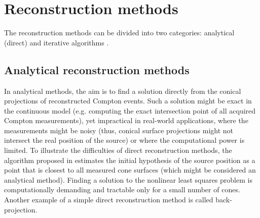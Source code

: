 \section{Reconstruction methods}
The reconstruction methods can be divided into two categories: analytical (direct) and iterative algorithms \cite{lojacono2}.
\subsection{Analytical reconstruction methods}
In analytical methods, the aim is to find a solution directly from the conical projections of reconstructed Compton events.
Such a solution might be exact in the continuous model (e.g. computing the exact intersection point of all acquired Compton measurements), yet impractical in real-world applications, where the measurements might be noisy (thus, conical surface projections might not intersect the real position of the source) or where the computational power is limited.
To illustrate the difficulties of direct reconstruction methods, the algorithm proposed in \cite{baca2021gamma} estimates the initial hypothesis of the source position as a point that is closest to all measured cone surfaces (which might be considered an analytical method).
Finding a solution to the nonlinear least squares problem is computationally demanding and tractable only for a small number of cones.
Another example of a simple direct reconstruction method is called back-projection.
